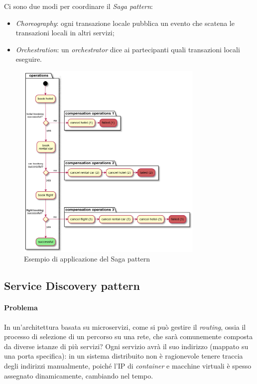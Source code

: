Ci sono due modi per coordinare il \textit{Saga pattern}:
\begin{itemize}
	\item \textit{Choreography}: ogni transazione locale pubblica un evento che scatena le transazioni locali in altri servizi;
	\item \textit{Orchestration}: un \textit{orchestrator} dice ai partecipanti quali transazioni locali eseguire.
\end{itemize}

\begin{figure}[H]
	\centering
	\includegraphics[width=0.8\textwidth]{immagini/saga-example.png}
	\caption[Esempio di Saga pattern]{Esempio di applicazione del Saga pattern\footnotemark}
\end{figure}


\subsection{Service Discovery pattern}\label{service-discovery}

\paragraph*{Problema} In un'architettura basata su microservizi, come si può gestire il \textit{routing}, ossia il processo di selezione di un percorso su una rete, che sarà comunemente composta da diverse istanze di più servizi?
Ogni servizio avrà il suo indirizzo (mappato su una porta specifica):  in un sistema distribuito non è ragionevole tenere traccia degli indirizzi manualmente, poiché l'IP di \textit{container} e macchine virtuali è spesso assegnato dinamicamente, cambiando nel tempo.

